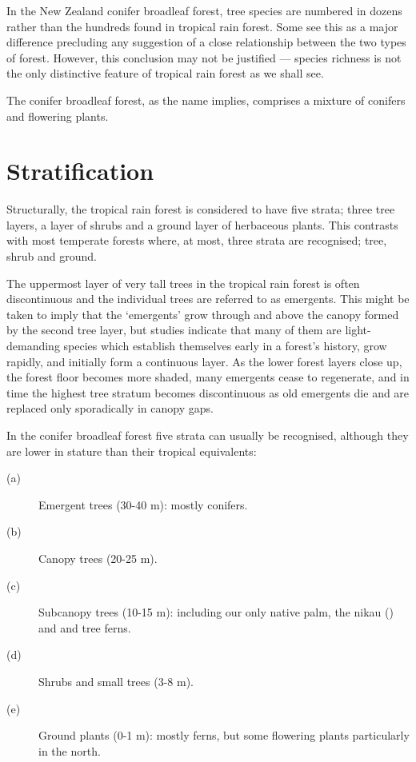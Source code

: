 In the New Zealand conifer broadleaf forest, tree species are numbered in dozens rather than the hundreds found in tropical rain forest.
Some see this as a major difference precluding any suggestion of a close relationship between the two types of forest.
However, this conclusion may not be justified — species richness is not the only distinctive feature of tropical rain forest as we shall see.

The conifer broadleaf forest, as the name implies, comprises a mixture of conifers and flowering plants.

\section{Stratification}

Structurally, the tropical rain forest is considered to have five strata; three tree layers, a layer of shrubs and a ground layer of herbaceous plants.
This contrasts with most temperate forests where, at most, three strata are recognised; tree, shrub and ground.

The uppermost layer of very tall trees in the tropical rain forest is often discontinuous and the individual trees are referred to as emergents.
This might be taken to imply that the `emergents' grow through and above the canopy formed by the second tree layer, but studies indicate that many of them are light-demanding species which establish themselves early in a forest's history, grow rapidly, and initially form a continuous layer.
As the lower forest layers close up, the forest floor becomes more shaded, many emergents cease to regenerate, and in time the highest tree stratum becomes discontinuous as old emergents die and are replaced only sporadically in canopy gaps.

In the conifer broadleaf forest five strata can usually be recognised, although they are lower in stature than their tropical equivalents:
\begin{description}
\item[{(a)}]Emergent trees (30-40 m): mostly conifers.
\item[{(b)}]Canopy trees (20-25 m).
\item[{(c)}]Subcanopy trees (10-15 m): including our only native palm, the nikau () and  and  tree ferns.
\item[{(d)}]Shrubs and small trees (3-8 m).
\item[{(e)}]Ground plants (0-1 m): mostly ferns, but some flowering plants particularly in the north.
\end{description}
